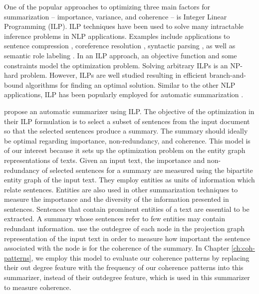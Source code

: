 One of the popular approaches to optimizing three main factors for summarization -- importance, variance, and coherence -- is Integer Linear Programming (ILP). 
ILP techniques have been used to solve many intractable inference problems in NLP applications. 
Examples include applications to sentence compression \cite{clarke10,filippova13}, coreference resolution \cite{denis09},  syntactic parsing \cite{klenner07a}, as well as semantic role labeling \cite{punyakanok04b}.
In an ILP approach, an objective function and some constraints model the optimization problem.  
Solving arbitrary ILPs is an \mbox{NP-hard} problem. 
However, ILPs are well studied resulting in efficient \mbox{branch-and-bound} algorithms for finding an optimal solution. 
Similar to the other NLP applications, ILP has been popularly employed for automatic summarization 
\cite{nishikawa10,galanis12,marciniak05b,mcdonald07,bergkirkpatrick11,woodsend12,lichen13a,hirao13}.  

 propose an automatic summarizer using ILP.  
The objective of the optimization in their ILP formulation is to select a subset of sentences from the input document so that the selected sentences produce a summary.
The summary should ideally be optimal regarding importance, non-redundancy, and coherence. 
This model is of our interest because it sets up the optimization problem on the entity graph representations of texts. 
Given an input text, the importance and non-redundancy of selected sentences for a summary are measured using the bipartite entity graph of the input text. 
They employ entities as units of information which relate sentences. 
Entities are also used in other summarization techniques to measure the importance and the diversity of the information presented in sentences.   
Sentences that contain prominent entities of a text are essential to be extracted. 
A summary whose sentences refer to few entities may contain redundant information. 
 use the outdegree of each node in the projection graph representation of the input text in order to measure how important the sentence associated with the node is for the coherence of the summary.  
In Chapter \ref{ch:coh-patterns}, we employ this model to evaluate our coherence patterns by replacing their out degree feature with the frequency of our coherence patterns into this summarizer, instead of their outdegree feature, which is used in this summarizer to measure coherence. 


